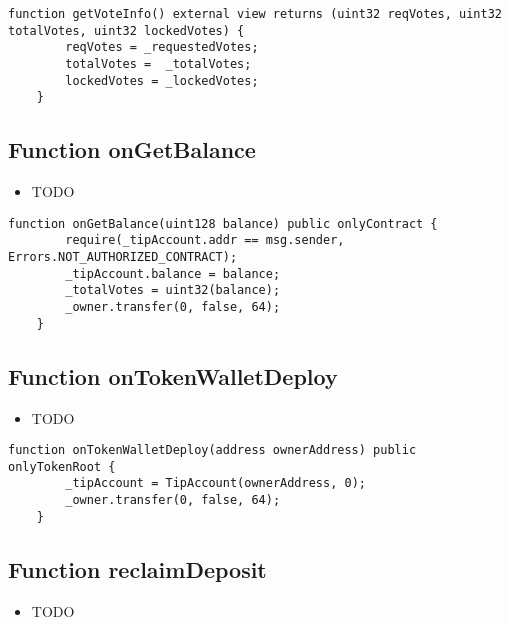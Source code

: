 \begin{lstlisting}[firstnumber=218]
    function getVoteInfo() external view returns (uint32 reqVotes, uint32 totalVotes, uint32 lockedVotes) {
        reqVotes = _requestedVotes;
        totalVotes =  _totalVotes;
        lockedVotes = _lockedVotes;
    }
\end{lstlisting}

\subsection{Function onGetBalance}

\begin{itemize}
\item TODO
\end{itemize}

\begin{lstlisting}[firstnumber=181]
    function onGetBalance(uint128 balance) public onlyContract {
        require(_tipAccount.addr == msg.sender, Errors.NOT_AUTHORIZED_CONTRACT);
        _tipAccount.balance = balance;
        _totalVotes = uint32(balance);
        _owner.transfer(0, false, 64);
    }
\end{lstlisting}

\subsection{Function onTokenWalletDeploy}

\begin{itemize}
\item TODO
\end{itemize}

\begin{lstlisting}[firstnumber=192]
    function onTokenWalletDeploy(address ownerAddress) public onlyTokenRoot {
        _tipAccount = TipAccount(ownerAddress, 0);
        _owner.transfer(0, false, 64);
    }
\end{lstlisting}

\subsection{Function reclaimDeposit}

\begin{itemize}
\item TODO
\end{itemize}


